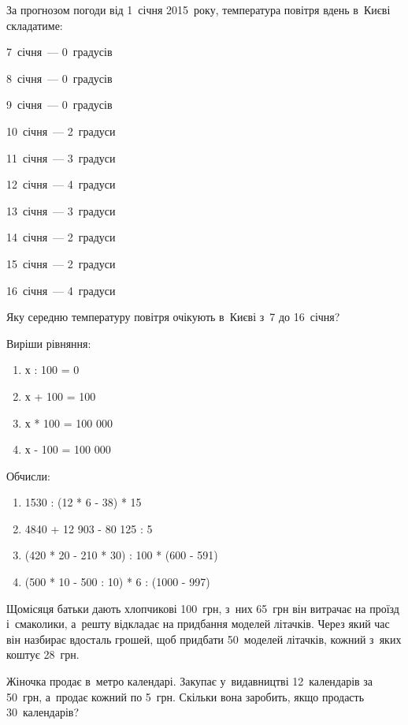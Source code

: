\problem
За прогнозом погоди від 1~січня 2015~року, температура повітря вдень
в~Києві складатиме:

\begin{multicols}{2}
    7~січня~--- 0~градусів

    8~січня~--- 0~градусів

    9~січня~--- 0~градусів

    10~січня~--- 2~градуси

    11~січня~--- 3~градуси

    12~січня~--- 4~градуси

    13~січня~--- 3~градуси

    14~січня~--- 2~градуси

    15~січня~--- 2~градуси

    16~січня~--- 4~градуси
\end{multicols}

Яку середню температуру повітря очікують в~Києві з~7 до 16~січня?


\problem
Виріши рівняння:
\begin{multicols}{2}
    \begin{enumerate}
        \item х : 100 = 0
        \item х + 100 = 100
        \item х * 100 = 100 000
        \item х - 100 = 100 000
    \end{enumerate}
\end{multicols}


\problem
Обчисли:
\begin{enumerate}
    \item 1530 : (12 * 6 - 38) * 15
    \item 4840 + 12 903 - 80 125 : 5
    \item (420 * 20 - 210 * 30) : 100 * (600 - 591)
    \item (500 * 10 - 500 : 10) * 6 : (1000 - 997)
\end{enumerate}


\problem
Щомісяця батьки дають хлопчикові 100~грн, з~них 65~грн він витрачає
на проїзд і~смаколики, а~решту відкладає на придбання моделей літачків.
Через який час він назбирає вдосталь грошей, щоб придбати 50~моделей літачків,
кожний з~яких коштує 28~грн.


\problem
Жіночка продає в~метро календарі.
Закупає у~видавництві 12~календарів за 50~грн, а~продає кожний по 5~грн.
Скільки вона заробить, якщо продасть 30~календарів?


